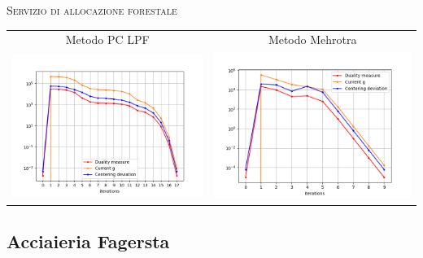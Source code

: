 \begin{frame}{\textsc{\LARGE \textcolor{iris}{Servizio di allocazione forestale}}}
	\centering
	\begin{tabular}{c@{}c}
		\small{Metodo PC LPF} & \small{Metodo Mehrotra} \\
		\includegraphics[scale = 0.33]{for_PCLPF}
		&\includegraphics[scale = 0.33]{for_MER}\\ 
	\end{tabular}
\end{frame}


\subsection{Acciaieria Fagersta}

